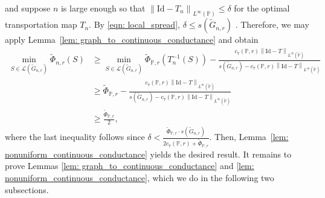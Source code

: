 \documentclass[11pt,twoside]{article}
\newcommand{\norm}[1]{\left\lVert#1\right\rVert}
\newcommand{\1}{\mathbf{1}}
\newcommand{\Pbb}{\mathbb{P}}
\begin{document}
and suppose $n$ is large enough so that $\norm{\mathrm{Id} - T_n}_{L^{\infty}(\Pbb)} \leq \delta$ for the optimal transportation map $T_n$.
By \eqref{eqn: local_spread}, $\delta \leq s(\widetilde{G}_{n,r})$ . Therefore, we may apply Lemma~\ref{lem: graph_to_continuous_conductance} and obtain
\begin{align*}
\min_{S \in \mathcal{L}(\widetilde{G}_{n,r})} \widetilde{\Phi}_{n,r}(S) & \geq \min_{S \in \mathcal{L}(\widetilde{G}_{n,r})} \widetilde{\Phi}_{\Pbb,r}(T_n^{-1}(S)) - \frac{c_7(\Pbb,r) \norm{\mathrm{Id} - T}_{L^{\infty}(\widetilde{\Pbb})} }{s(\widetilde{G}_{n,r}) - c_7(\Pbb,r)\norm{\mathrm{Id} - T}_{L^{\infty}(\widetilde{\Pbb})}} \\
& \geq  \widetilde{\Phi}_{\Pbb,r} -  \frac{c_7(\Pbb,r) \norm{\mathrm{Id} - T}_{L^{\infty}(\widetilde{\Pbb})} }{s(\widetilde{G}_{n,r}) - c_7(\Pbb,r)\norm{\mathrm{Id} - T}_{L^{\infty}(\widetilde{\Pbb})}} \\
& \geq \frac{\widetilde{\Phi}_{\Pbb,r}}{2},
\end{align*}
where the last inequality follows since $\delta < \frac{\widetilde{\Phi}_{\Pbb,r}\cdot s(\widetilde{G}_{n,r})}{2c_7(\Pbb,r) + \widetilde{\Phi}_{\Pbb,r}}$. Then, Lemma~\ref{lem: nonuniform_continuous_conductance} yields the desired result. It remains to prove Lemmas \ref{lem: graph_to_continuous_conductance} and \ref{lem: nonuniform_continuous_conductance}, which we do in the following two subsections.
\end{document}
